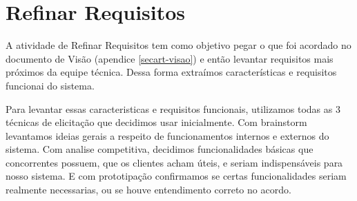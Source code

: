 \chapter{Refinar Requisitos}
\label{sec:refinar-req}

A atividade de Refinar Requisitos tem como objetivo pegar o que foi acordado no documento de Visão (apendice \ref{secart-visao}) e então levantar requisitos mais próximos da equipe técnica. Dessa forma extraímos características e requisitos funcionai do sistema.

Para levantar essas caracteristicas e requisitos funcionais, utilizamos todas as 3 técnicas de elicitação que decidimos usar inicialmente. Com brainstorm levantamos ideias gerais a respeito de funcionamentos internos e externos do sistema. Com analise competitiva, decidimos funcionalidades básicas que concorrentes possuem, que os clientes acham úteis, e seriam indispensáveis para nosso sistema. E com prototipação confirmamos se certas funcionalidades seriam realmente necessarias, ou se houve entendimento correto no acordo.

\label{sec:carac}

